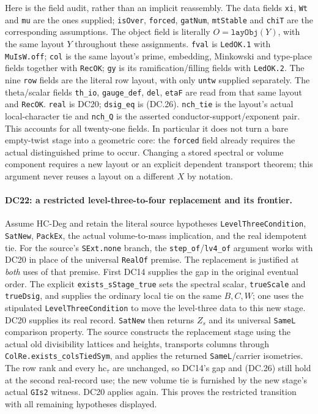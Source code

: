 Here is the field audit, rather than an implicit reassembly.
The data fields \texttt{xi}, \texttt{Wt} and \texttt{mu} are the
ones supplied; \texttt{isOver}, \texttt{forced}, \texttt{gatNum},
\texttt{mtStable} and \texttt{chiT} are the corresponding assumptions.
The object field is literally $O=\texttt{layObj}(Y)$, with the same
layout $Y$ throughout these assignments.
\texttt{fval} is \texttt{LedOK.1} with \texttt{MuIsW.off};
\texttt{col} is the same layout's prime, embedding, Minkowski and
type-place fields together with \texttt{RecOK};
\texttt{gy} is its ramification/filling fields with \texttt{LedOK.2}.
The nine \texttt{row} fields are the literal row layout, with only
\texttt{untw} supplied separately.  The theta/scalar fields
\texttt{th\_io}, \texttt{gauge\_def}, \texttt{del}, \texttt{etaF}
are read from that same layout and \texttt{RecOK}.
\texttt{real} is DC20; \texttt{dsig\_eq} is (DC.26).
\texttt{nch\_tie} is the layout's actual local-character tie and
\texttt{nch\_Q} is the asserted conductor-support/exponent pair.
This accounts for all twenty-one fields.  In particular it does
not turn a bare empty-twist stage into a geometric core: the
\texttt{forced} field already requires the actual distinguished
prime to occur.  Changing a stored spectral or volume component
requires a new layout or an explicit dependent transport theorem;
this argument never reuses a layout on a different $X$ by notation.

\paragraph{DC22: a restricted level-three-to-four replacement and its frontier.}
\label{claim:DC22}
Assume HC-Deg and retain the literal source hypotheses
\texttt{LevelThreeCondition}, \texttt{SatNew}, \texttt{PackEx},
the actual volume-to-mass implication, and the real idempotent
tie.  For the source's \texttt{SExt.none} branch, the
\texttt{step\_of}/\texttt{lv4\_of} argument works with DC20 in
place of the universal \texttt{RealOf} premise.  The replacement
is justified at \emph{both} uses of that premise.  First DC14
supplies the gap in the original eventual order.  The explicit
\texttt{exists\_sStage\_true} sets the spectral scalar,
\texttt{trueScale} and \texttt{trueDsig}, and supplies the ordinary
local tie on the same $B,C,W$; one uses the stipulated
\texttt{LevelThreeCondition} to move the level-three data to
this new stage.  DC20 supplies its real record.  \texttt{SatNew}
then returns $Z_s$ and its universal \texttt{SameL} comparison
property.  The source constructs the replacement stage using
the actual old divisibility lattices and heights, transports
columns through \texttt{ColRe.exists\_colsTiedSym}, and applies
the returned \texttt{SameL}/carrier isometries.  The row rank and
every $\mathrm{hc}_\tau$ are unchanged, so DC14's gap and
(DC.26) still hold at the second real-record use; the new volume
tie is furnished by the new stage's actual \texttt{GIs2} witness.
DC20 applies again.  This proves the restricted transition with
all remaining hypotheses displayed.

